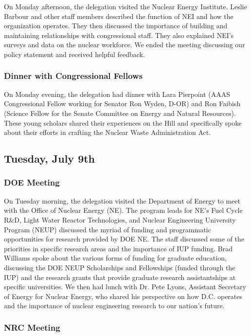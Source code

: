 On Monday afternoon, the delegation visited the Nuclear Energy Institute. Leslie
Barbour and other staff members described the function of NEI and how the
organization operates. They then discussed the importance of building and
maintaining relationships with congressional staff. They also explained NEI's
surveys and data on the nuclear workforce. We ended the meeting discussing our
policy statement and received helpful feedback.

\subsubsection*{Dinner with Congressional Fellows}

On Monday evening, the delegation had dinner with Lara Pierpoint (AAAS
Congressional Fellow working for Senator Ron Wyden, D-OR) and Ron Faibish
(Science Fellow for the Senate Committee on Energy and Natural Resources). These
young scholars shared their experiences on the Hill and specifically spoke about
their efforts in crafting the Nuclear Waste Administration Act.

\subsection*{Tuesday, July 9th}

\subsubsection*{DOE Meeting}

On Tuesday morning, the delegation visited the Department of Energy to meet with
the Office of Nuclear Energy (NE). The program leads for NE’s Fuel Cycle R\&D,
Light Water Reactor Technologies, and Nuclear Engineering University Program
(NEUP) discussed the myriad of funding and programmatic opportunities for
research provided by DOE NE. The staff discussed some of the priorities in
specific research areas and the importance of IUP funding. Brad Williams spoke
about the various forms of funding for graduate education, discussing the DOE
NEUP Scholarships and Fellowships (funded through the IUP) and the research
grants that provide graduate research assistantships at specific
universities. We then had lunch with Dr. Pete Lyons, Assistant Secretary of
Energy for Nuclear Energy, who shared his perspective on how D.C. operates and
the importance of nuclear engineering research to our nation's future.

\subsubsection*{NRC Meeting}

